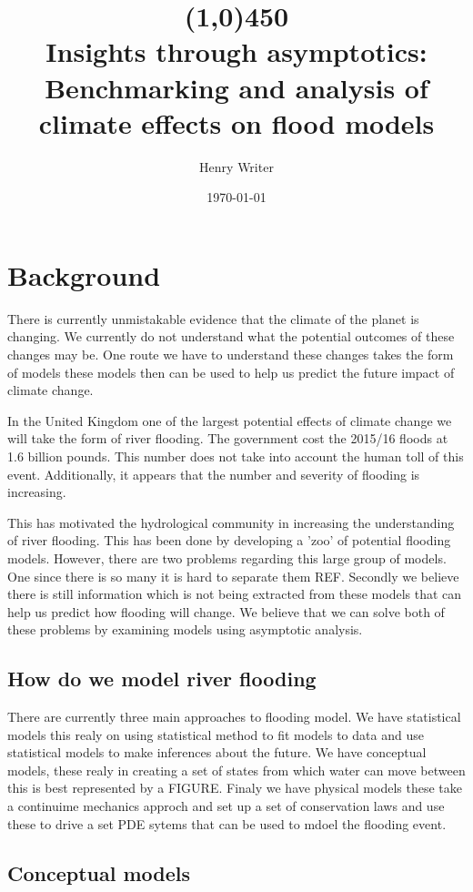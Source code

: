 \documentclass[11pt]{article}
\title{\line(1,0){450} \\ \Huge\textbf{Insights through asymptotics:}\\
 \LARGE Benchmarking and analysis of climate effects on flood models}
\author{Henry Writer }
\date{\monthyeardate\today}
\begin{document}
\maketitle

\section{Background}

There is currently unmistakable evidence that the climate of the planet is changing. We currently do not understand what the potential outcomes of these changes may be. One route we have to understand these changes takes the form of models these models then can be used to help us predict the future impact of climate change.

In the United Kingdom one of the largest potential effects of climate change we will take the form of river flooding. The government cost the 2015/16 floods at 1.6 billion pounds. This number does not take into account the human toll of this event. Additionally, it appears that the number and severity of flooding is increasing. 


This has motivated the hydrological community in increasing the understanding of river flooding. This has been done by developing a 'zoo' of potential flooding models. However, there are two problems regarding this large group of models. One since there is so many it is hard to separate them REF. 
Secondly we believe there is still information which is not being extracted from these models that can help us predict how flooding will change. We believe that we can solve both of these problems by examining models using asymptotic analysis.

\subsection{How do we model river flooding}
There are currently three main approaches to flooding model. We have statistical models this realy on using statistical method to fit models to data and use statistical models to make inferences about the future. 
We have conceptual models, these realy in creating a set of states from which water can move between this is best represented by a FIGURE. 
Finaly we have physical models these take a continuime mechanics approch and set up a set of conservation laws and use these to drive a set PDE sytems that can be used to mdoel the flooding event.



\subsection{Conceptual models}
\end{document}
